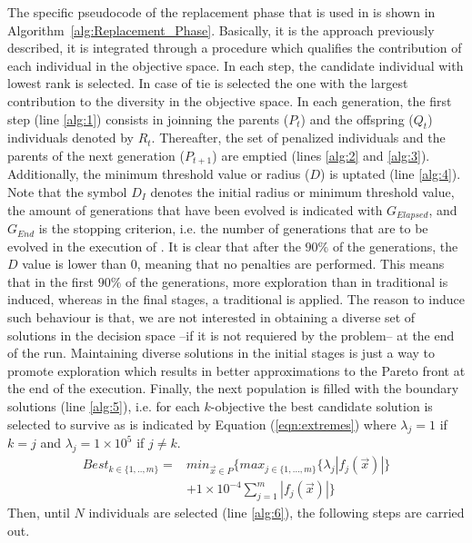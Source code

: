 The specific pseudocode of the replacement phase that is used in \VSDMOEA{} is shown in Algorithm~\ref{alg:Replacement_Phase}.
%
Basically, it is the approach previously described, it is integrated through a procedure which qualifies the contribution of each individual in the objective space.
%
In each step, the candidate individual with lowest rank is selected.
%
In case of tie is selected the one with the largest contribution to the diversity in the objective space.
%
In each generation, the first step (line \ref{alg:1}) consists in joinning the parents ($P_t$) and the offspring ($Q_t$) individuals denoted by $R_t$.
%
Thereafter, the set of penalized individuals and the parents of the next generation ($P_{t+1}$) are emptied (lines \ref{alg:2} and \ref{alg:3}).
%
Additionally, the minimum threshold value or radius ($D$) is uptated (line \ref{alg:4}).
%
Note that the symbol $D_I$ denotes the initial radius or minimum threshold value, the amount of generations that have been evolved is indicated with $G_{Elapsed}$, and $G_{End}$
is the stopping criterion, i.e. the number of generations that are to be evolved in the execution of \VSDMOEA{}.
%
It is clear that after the $90\%$ of the generations, the $D$ value is lower than 0, meaning that no penalties are performed.
%
This means that in the first $90\%$ of the generations, more exploration than in traditional \MOEAS{} is induced, whereas 
in the final stages, a traditional \MOEA{} is applied.
%
The reason to induce such behaviour is that, we are not interested in obtaining a diverse set of solutions in the decision space --if it is not requiered by the problem-- at the end of the run.
%
Maintaining diverse solutions in the initial stages is just a way to promote exploration which results in better approximations to the Pareto front at the end of the execution.
%
Finally, the next population is filled with the boundary solutions (line \ref{alg:5}), i.e. for each $k$-objective the best candidate solution is selected to survive as is indicated by Equation (\ref{eqn:extremes}) where $\lambda_j = 1$ if $k=j$ and  $\lambda_j = 1 \times 10^5$ if $j \neq k$.
\begin{equation}\label{eqn:extremes}
\begin{split}
 Best_{k \in \{1,..,m\}} = &  min_{ \vec{x} \in P} \{max_{j \in \{1, ..., m\} } \{ \lambda_j | f_j( \vec{x} ) | \} \\
& + 1 \times 10^{-4} \sum_{j=1}^m |f_j( \vec{x} ) | \}  
\end{split}
\end{equation}
%
Then, until $N$ individuals are selected (line \ref{alg:6}), the following steps are carried out.
